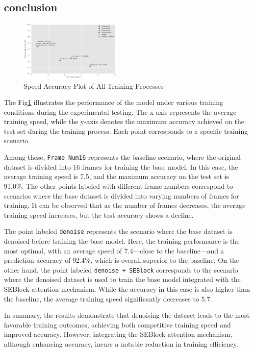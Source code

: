 \documentclass[conference]{IEEEtran}
\begin{document}
\subsection{conclusion}
\begin{figure}[htbp]
    \centering
    \includegraphics[width=0.45\textwidth]{figure/acc_speed.png}
    \caption{Speed-Accuracy Plot of All Training Processes}
    \label{fig:acc_speed_all}
\end{figure}
The Fig\ref{fig:acc_speed_all} illustrates the performance of the model under various training conditions during the experimental testing. The x-axis represents the average training speed, while the y-axis denotes the maximum accuracy achieved on the test set during the training process. Each point corresponds to a specific training scenario.

Among these, \texttt{Frame\_Num16} represents the baseline scenario, where the original dataset is divided into 16 frames for training the base model. In this case, the average training speed is 7.5, and the maximum accuracy on the test set is 91.0\%. The other points labeled with different frame numbers correspond to scenarios where the base dataset is divided into varying numbers of frames for training. It can be observed that as the number of frames decreases, the average training speed increases, but the test accuracy shows a decline.

The point labeled \texttt{denoise} represents the scenario where the base dataset is denoised before training the base model. Here, the training performance is the most optimal, with an average speed of 7.4—close to the baseline—and a prediction accuracy of 92.4\%, which is overall superior to the baseline. On the other hand, the point labeled \texttt{denoise + SEBlock} corresponds to the scenario where the denoised dataset is used to train the base model integrated with the SEBlock attention mechanism. While the accuracy in this case is also higher than the baseline, the average training speed significantly decreases to 5.7.

In summary, the results demonstrate that denoising the dataset leads to the most favorable training outcomes, achieving both competitive training speed and improved accuracy. However, integrating the SEBlock attention mechanism, although enhancing accuracy, incurs a notable reduction in training efficiency.
\end{document}
